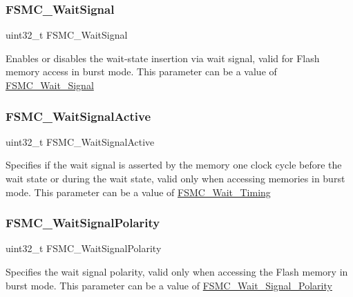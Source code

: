 \subsubsection{\texorpdfstring{FSMC\_WaitSignal}{FSMC\_WaitSignal}}
{\footnotesize\ttfamily uint32\+\_\+t F\+S\+M\+C\+\_\+\+Wait\+Signal}

Enables or disables the wait-\/state insertion via wait signal, valid for Flash memory access in burst mode. This parameter can be a value of \mbox{\hyperlink{group___f_s_m_c___wait___signal}{F\+S\+M\+C\+\_\+\+Wait\+\_\+\+Signal}} \mbox{\label{struct_f_s_m_c___n_o_r_s_r_a_m_init_type_def_aef0e381a5fbf637ad892903889a63583}} 
\subsubsection{\texorpdfstring{FSMC\_WaitSignalActive}{FSMC\_WaitSignalActive}}
{\footnotesize\ttfamily uint32\+\_\+t F\+S\+M\+C\+\_\+\+Wait\+Signal\+Active}

Specifies if the wait signal is asserted by the memory one clock cycle before the wait state or during the wait state, valid only when accessing memories in burst mode. This parameter can be a value of \mbox{\hyperlink{group___f_s_m_c___wait___timing}{F\+S\+M\+C\+\_\+\+Wait\+\_\+\+Timing}} \mbox{\label{struct_f_s_m_c___n_o_r_s_r_a_m_init_type_def_a1b4af656a06371a567ccf494274c1261}} 
\subsubsection{\texorpdfstring{FSMC\_WaitSignalPolarity}{FSMC\_WaitSignalPolarity}}
{\footnotesize\ttfamily uint32\+\_\+t F\+S\+M\+C\+\_\+\+Wait\+Signal\+Polarity}

Specifies the wait signal polarity, valid only when accessing the Flash memory in burst mode. This parameter can be a value of \mbox{\hyperlink{group___f_s_m_c___wait___signal___polarity}{F\+S\+M\+C\+\_\+\+Wait\+\_\+\+Signal\+\_\+\+Polarity}} \mbox{\label{struct_f_s_m_c___n_o_r_s_r_a_m_init_type_def_a62dd24d87fe026df5e35dc58a00988b4}} 
